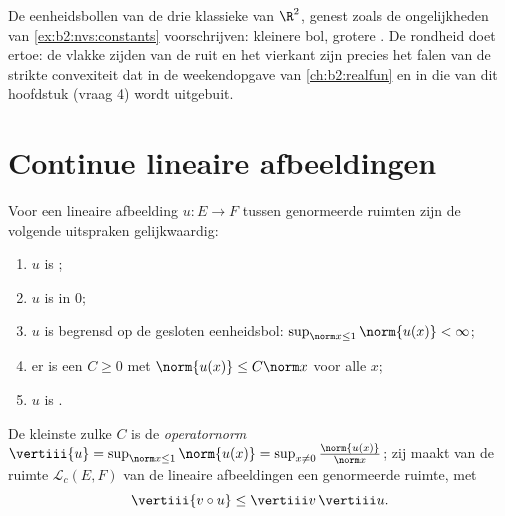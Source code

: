 \begin{omfigure}

{\small De eenheidsbollen van de drie klassieke  van $\R^2$,
genest zoals de ongelijkheden van \cref{ex:b2:nvs:constants}
voorschrijven: kleinere bol, grotere . De rondheid doet ertoe:
de vlakke zijden van de ruit en het vierkant zijn precies het
falen van de strikte convexiteit dat in de weekendopgave van
\cref{ch:b2:realfun} en in die van dit hoofdstuk (vraag 4) wordt
uitgebuit.}
\end{omfigure}

\section{Continue lineaire afbeeldingen}

\begin{theorem}[Karakterisering]\label{thm:b2:nvs:continuouslinear}
Voor een lineaire afbeelding $u \colon E \to F$ tussen genormeerde
ruimten zijn de volgende uitspraken gelijkwaardig:
\begin{enumerate}
  \item $u$ is ;
  \item $u$ is  in $0$;
  \item $u$ is begrensd op de gesloten eenheidsbol: $\sup_{\norm x
        \leq 1} \norm{u(x)} < \infty$;
  \item er is een $C \geq 0$ met $\norm{u(x)} \leq C \norm x$ voor
        alle $x$;
  \item $u$ is .
\end{enumerate}
De kleinste zulke $C$ is de
\emph{operatornorm} $\vertiii{u} = \sup_{\norm
x \leq 1}\norm{u(x)} = \sup_{x \neq 0} \frac{\norm{u(x)}}{\norm
x}$; zij maakt van de ruimte $\mathcal{L}_c(E, F)$ van de 
lineaire afbeeldingen een genormeerde ruimte, met
\[
\vertiii{v \circ u} \leq \vertiii v\, \vertiii u .
\]
\end{theorem}

